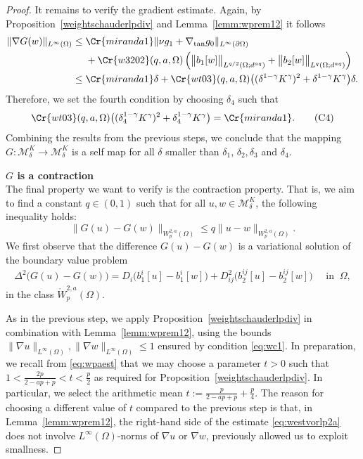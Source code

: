 \documentclass[12pt,a4paper,twoside]{article}
\newcommand{\M}{\mathcal {M}}
\newcommand {\cb}[1] {\tikz[baseline=(char.base)]{
            \node[shape=circle,draw,inner sep=2pt] (char) {\itshape{\textbf{#1}}};}}
\begin{document}
\begin{proof}
It remains to verify the gradient estimate. Again, by Proposition~\ref{weightschauderlpdiv} and Lemma~\ref{lemm:wprem12} it follows
 \begin{align*}
             \|\nabla G(w)\|_{L^\infty(\Omega)} &\le \Cr{miranda1}
   \| \nu g_1
   +
   \nabla_{\rm tan} g_0\|_{L^\infty(\partial\Omega)}
\\
&\ \quad  + 
        \Cr{w3202}(q,a,\Omega) \left(
     \big\|b_1[w] \big\|_{L^{q/2}(\Omega ;d^{aq})}
   +  \big\|b_2[w] \big\|_{L^{q}(\Omega ;d^{aq})}
    \right) \\
   &\le \Cr{miranda1} \delta  + \Cr{wt03}(q,a, \Omega)\big((\delta^{1-\gamma}K^\gamma)^2 + \delta^{1-\gamma}K^\gamma \big)\delta.
 \end{align*}
Therefore, we set the fourth condition by choosing $\delta_4$  such that 
\begin{align}
         \Cr{wt03}(q,a, \Omega)\big((\delta_4^{1-\gamma}K^\gamma)^2 + \delta_4^{1-\gamma}K^\gamma \big)=\Cr{miranda1}  . \tag{C4}\label{eq:wc4}
\end{align}
Combining the results from the previous steps, we conclude that the mapping $G\colon\M_\delta^K \to \M_\delta^K $ is a self map for all $\delta$ smaller than $\delta_1$, $\delta_2, \delta_3 $ and $ \delta_4$.

\noindent\cb{3} \textbf{ $G$ is a contraction}\\
The final property we want to verify is the contraction property. That is, we aim to find a constant  $q\in(0,1)$ such that for all $u,w\in \M_\delta^K $,  the following inequality holds: 
\[
 \|G (u)-G (w)\|_{W^{2,a}_p(\Omega)}  \le q \|u-w\|_{{W^{2,a}_p(\Omega)}}.
 \] We first observe that the difference $G(u)-G(w)$ is a variational solution of the boundary value problem
 \begin{align*}
\Delta^2\big (G (u)- G (w) \big) = D_i \big( b^i_1[u]- b^i_1[w] \big) + D^2_{ij} \big( b^{ij}_2[u] - b^{ij}_2[w] \big)  \quad \text{ in } \ \Omega, 
\end{align*}
in the class $\mathring W^{2,a}_p(\Omega)$. 

As in the previous step, we apply Proposition~\ref{weightschauderlpdiv} in combination with Lemma~\ref{lemm:wprem12}, using the bounds  $\| \nabla u\|_{L^\infty({\Omega})},\| \nabla w\|_{L^\infty({\Omega})}\le 1$  ensured by condition \eqref{eq:wc1}. 
In preparation, we recall from \eqref{eq:wpaest} that we may choose a parameter $t>0$ such that $ 1< \frac{2p}{2-ap+p}<t< \frac{p}{2}$ as required for Proposition~\ref{weightschauderlpdiv}. In particular, we select the arithmetic mean $t:=\frac{p}{2-ap+p}+ \frac{p}{4}$. The reason for choosing a different value of $t$ compared to the previous step is that, in Lemma~\ref{lemm:wprem12}, the right-hand side of the estimate \eqref{eq:westvorlp2a} does not involve $L^\infty(\Omega)$-norms of $\nabla u$ or $ \nabla w$, previously allowed us to exploit smallness. 


\end{proof}
\end{document}
